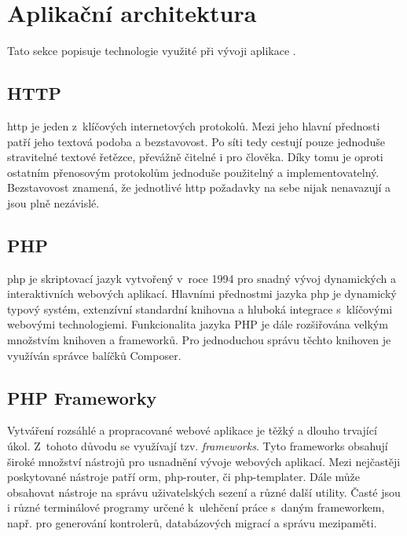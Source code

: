 \section{Aplikační architektura}
\label{sub:app-architecture}

Tato sekce popisuje technologie využité při vývoji aplikace \bso.

\subsection{HTTP}

\acrshort{http}\cite{http} je jeden z~klíčových internetových protokolů. Mezi jeho hlavní přednosti patří jeho textová podoba a bezstavovost. Po síti tedy cestují pouze jednoduše stravitelné textové řetězce, převážně čitelné i pro člověka. Díky tomu je oproti ostatním přenosovým protokolům jednoduše použitelný a implementovatelný. Bezstavovost znamená, že jednotlivé \acrshort{http} požadavky na sebe nijak nenavazují a jsou plně nezávislé.

\subsection{PHP}
\label{sub:php}

\acrshort{php}\cite{php} je skriptovací jazyk vytvořený v~roce 1994 pro snadný vývoj dynamických a interaktivních webových aplikací. Hlavními přednostmi jazyka \acrshort{php} je dynamický typový systém, extenzívní standardní knihovna a hluboká integrace s~klíčovými webovými technologiemi. Funkcionalita jazyka PHP je dále rozšiřována velkým množstvím knihoven a frameworků. Pro jednoduchou správu těchto knihoven je využíván správce balíčků Composer\cite{composer}.

\subsection{PHP Frameworky}

Vytváření rozsáhlé a propracované webové aplikace je těžký a dlouho trvající úkol. Z~tohoto důvodu se využívají tzv. \emph{\glspl{framework}}. Tyto \glspl{framework} obsahují široké množství nástrojů pro usnadnění vývoje webových aplikací. Mezi nejčastěji poskytované nástroje patří \Gls{orm}\cite{orm}, \gls{php-router}\cite{php-router}, či \gls{php-templater}\cite{php-templater}. Dále může obsahovat nástroje na správu uživatelských sezení a různé další utility. Časté jsou i různé terminálové programy určené k~ulehčení práce s~daným \gls{framework}em, např. pro generování kontrolerů, databázových migrací a správu mezipaměti.

